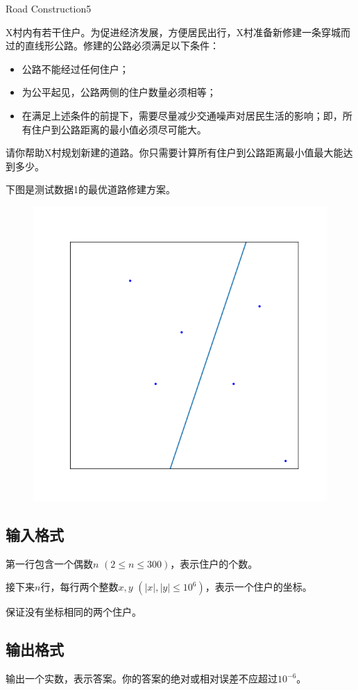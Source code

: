 \begin{Problem}{Road Construction}{5}

X村内有若干住户。为促进经济发展，方便居民出行，X村准备新修建一条穿城而过的直线形公路。修建的公路必须满足以下条件：

\begin{itemize}
\item 公路不能经过任何住户；
\item 为公平起见，公路两侧的住户数量必须相等；
\item 在满足上述条件的前提下，需要尽量减少交通噪声对居民生活的影响；即，所有住户到公路距离的最小值必须尽可能大。
\end{itemize}

请你帮助X村规划新建的道路。你只需要计算所有住户到公路距离最小值最大能达到多少。

下图是测试数据1的最优道路修建方案。

\begin{figure}[h]
\center
\includegraphics{src/road/01-sample.png}
\end{figure}

\subsection*{输入格式}

第一行包含一个偶数$n$ $(2 \leq n \leq 300)$，表示住户的个数。

接下来$n$行，每行两个整数$x, y$ $(|x|, |y| \leq 10^6)$，表示一个住户的坐标。

保证没有坐标相同的两个住户。

\subsection*{输出格式}

输出一个实数，表示答案。你的答案的绝对或相对误差不应超过$10^{-6}$。


\end{Problem}
